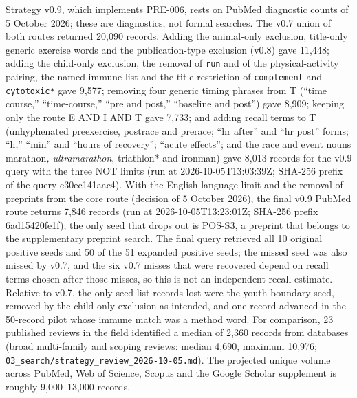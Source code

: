 \documentclass[
  11pt,
  a4paper,
]{article}
\begin{document}
Strategy v0.9, which implements PRE-006, rests on PubMed diagnostic
counts of 5 October 2026; these are diagnostics, not formal searches.
The v0.7 union of both routes returned 20,090 records. Adding the
animal-only exclusion, title-only generic exercise words and the
publication-type exclusion (v0.8) gave 11,448; adding the child-only
exclusion, the removal of \texttt{run} and of the physical-activity
pairing, the named immune list and the title restriction of
\texttt{complement} and \texttt{cytotoxic*} gave 9,577; removing four
generic timing phrases from T (``time course,'' ``time-course,'' ``pre
and post,'' ``baseline and post'') gave 8,909; keeping only the route E
AND I AND T gave 7,733; and adding recall terms to T (unhyphenated
preexercise, postrace and prerace; ``hr after'' and ``hr post'' forms;
``h,'' ``min'' and ``hours of recovery''; ``acute effects''; and the
race and event nouns marathon\emph{, ultramarathon}, triathlon* and
ironman) gave 8,013 records for the v0.9 query with the three NOT limits
(run at 2026-10-05T13:03:39Z; SHA-256 prefix of the query e30ec141aac4).
With the English-language limit and the removal of preprints from the
core route (decision of 5 October 2026), the final v0.9 PubMed route
returns 7,846 records (run at 2026-10-05T13:23:01Z; SHA-256 prefix
6ad15420fe1f); the only seed that drops out is POS-S3, a preprint that
belongs to the supplementary preprint search. The final query retrieved
all 10 original positive seeds and 50 of the 51 expanded positive seeds;
the missed seed was also missed by v0.7, and the six v0.7 misses that
were recovered depend on recall terms chosen after those misses, so this
is not an independent recall estimate. Relative to v0.7, the only
seed-list records lost were the youth boundary seed, removed by the
child-only exclusion as intended, and one record advanced in the
50-record pilot whose immune match was a method word. For comparison, 23
published reviews in the field identified a median of 2,360 records from
databases (broad multi-family and scoping reviews: median 4,690, maximum
10,976; \texttt{03\_search/strategy\_review\_2026-10-05.md}). The
projected unique volume across PubMed, Web of Science, Scopus and the
Google Scholar supplement is roughly 9,000--13,000 records.
\end{document}

